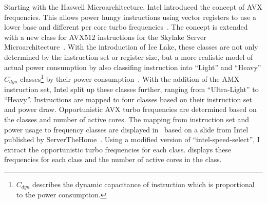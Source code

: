 Starting with the Haswell Microarchitecture, Intel introduced the concept of AVX frequencies.
This allows power hungy instructions using vector registers to use a lower base and different per core turbo frequencies~\cite{Hackenberg_2015_Haswell}.
The concept is extended with a new class for AVX512 instructions for the Skylake Server Microarchitecture~\cite[Sec. 2.6.3]{Intel_Optimization_Reference_Manual_050}.
With the introduction of Ice Lake, these classes are not only determined by the instruction set or register size, but a more realistic model of actual power consumption by also classifing instruction into ``Light'' and ``Heavy'' $C_{dyn}$ classes\footnote{$C_{dyn}$ describes the dynamic capacitance of instruction which is proportional to the power consumption.} by their power consumption~\cite{papazian_new_2020}.
With the addition of the AMX instruction set, Intel split up these classes further, ranging from ``Ultra-Light'' to ``Heavy''.
Instructions are mapped to four classes based on their instruction set and power draw.
Opportunistic AVX turbo frequencies are determined based on the classes and number of active cores.
The mapping from instruction set and power usage to frequency classes are displayed in~ based on a slide from Intel published by ServerTheHome~\cite{ServeTheHome_Emerald_Rapids_2023}.
Using a modified version of ``intel-speed-select'', I extract the opportunistic turbo frequencies for each class.
 displays these frequencies for each class and the number of active cores in the class.


